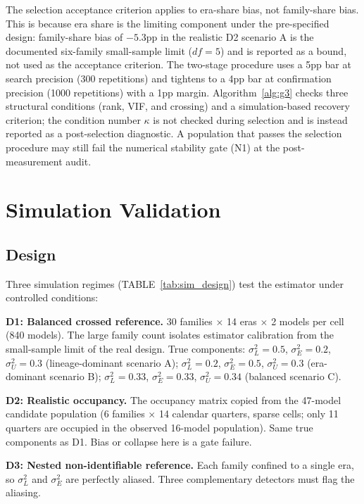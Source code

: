 \documentclass{ieeeaccess}
\theoremstyle{definition}
\theoremstyle{plain}
\begin{document}
The selection acceptance criterion applies to era-share bias, not family-share bias. This is because era share is the limiting component under the pre-specified design: family-share bias of $-5.3$pp in the realistic D2 scenario A is the documented six-family small-sample limit ($df = 5$) and is reported as a bound, not used as the acceptance criterion. The two-stage procedure uses a 5pp bar at search precision (300 repetitions) and tightens to a 4pp bar at confirmation precision (1000 repetitions) with a 1pp margin. Algorithm~\ref{alg:g3} checks three structural conditions (rank, VIF, and crossing) and a simulation-based recovery criterion; the condition number $\kappa$ is not checked during selection and is instead reported as a post-selection diagnostic. A population that passes the selection procedure may still fail the numerical stability gate (N1) at the post-measurement audit.

\section{Simulation Validation}
\label{sec:sim}

\subsection{Design}
Three simulation regimes (TABLE~\ref{tab:sim_design}) test the estimator under controlled conditions:

\textbf{D1: Balanced crossed reference.} 30 families $\times$ 14 eras $\times$ 2 models per cell (840 models). The large family count isolates estimator calibration from the small-sample limit of the real design. True components: $\sigma^2_L = 0.5$, $\sigma^2_E = 0.2$, $\sigma^2_U = 0.3$ (lineage-dominant scenario A); $\sigma^2_L = 0.2$, $\sigma^2_E = 0.5$, $\sigma^2_U = 0.3$ (era-dominant scenario B); $\sigma^2_L = 0.33$, $\sigma^2_E = 0.33$, $\sigma^2_U = 0.34$ (balanced scenario C).

\textbf{D2: Realistic occupancy.} The occupancy matrix copied from the 47-model candidate population (6 families $\times$ 14 calendar quarters, sparse cells; only 11 quarters are occupied in the observed 16-model population). Same true components as D1. Bias or collapse here is a gate failure.

\textbf{D3: Nested non-identifiable reference.} Each family confined to a single era, so $\sigma^2_L$ and $\sigma^2_E$ are perfectly aliased. Three complementary detectors must flag the aliasing.
\end{document}
